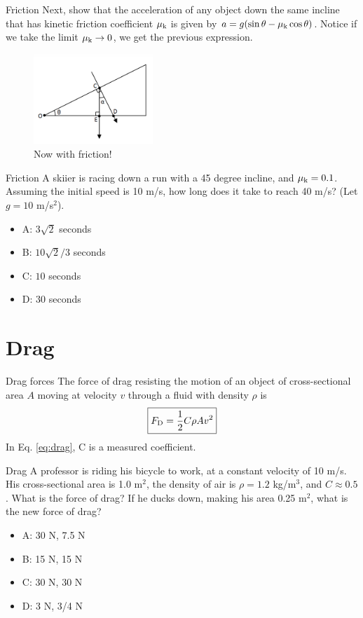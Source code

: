 \documentclass{beamer}
\begin{document}
\begin{frame}{Friction}
Next, show that the acceleration of any object down the same incline \alert{that has kinetic friction coefficient} $\mu_{\rm k} $ is given by $a = g(\sin\theta-\mu_{\rm k}\cos\theta)$.  Notice if we take the limit $\mu_{\rm k} \to 0$, we get the previous expression.
\begin{figure}
\centering
\includegraphics[width=0.4\textwidth]{figures/incline.png}
\caption{\label{fig:incline2} Now with friction!}
\end{figure}
\end{frame}

\begin{frame}{Friction}
A skiier is racing down a run with a 45 degree incline, and $\mu_{\rm k} = 0.1$.  Assuming the initial speed is 10 m/s, how long does it take to reach 40 m/s? (Let $g = 10$ m/s$^2$).
\begin{itemize}
\item A: $3\sqrt{2}$ seconds
\item B: $10\sqrt{2}/3$ seconds
\item C: $10$ seconds
\item D: $30$ seconds
\end{itemize}
\end{frame}

\section{Drag}

\begin{frame}{Drag forces}
\alert{The force of drag} resisting the motion of an object of cross-sectional area $A$ moving at velocity $v$ through a fluid with density $\rho$ is \\
\begin{equation}
\boxed{F_{\rm D} = \frac{1}{2}C\rho A v^2}
\label{eq:drag}
\end{equation}
In Eq. \ref{eq:drag}, C is a measured coefficient.
\end{frame}

\begin{frame}{Drag}
A professor is riding his bicycle to work, at a constant velocity of 10 m/s.  His cross-sectional area is 1.0 m$^2$, the density of air is $\rho = 1.2$ kg/m$^3$, and $C \approx 0.5$.  What is the force of drag?  If he ducks down, making his area 0.25 m$^2$, what is the new force of drag?
\begin{itemize}
\item A: 30 N, 7.5 N
\item B: 15 N, 15 N
\item C: 30 N, 30 N
\item D: 3 N, 3/4 N
\end{itemize}
\end{frame}
\end{document}
